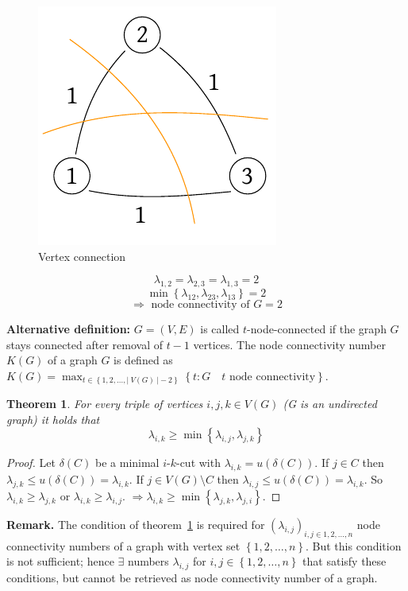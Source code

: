 \documentclass{article}
\newtheorem{theorem}{Theorem}
\newcommand{\card}[1]{\left|\:\!#1\:\!\right|}
\newcommand{\set}[1]{\left\{#1\right\}}
\begin{document}
\begin{figure}[ht]
 \begin{center}
  \includegraphics{img/vertex_connection.pdf}
  \caption{Vertex connection}
 \end{center}
\end{figure}
\[
  \lambda_{1,2} = \lambda_{2,3} = \lambda_{1,3} = 2
\] \[
  \min{\set{\lambda_{12}, \lambda_{23}, \lambda_{13}}} = 2
\] \[
  \Rightarrow \text{ node connectivity of } G = 2
\]

\textbf{Alternative definition:}
  $G = (V, E)$ is called $t$-node-connected if the graph $G$ stays connected after removal of $t-1$ vertices. The node connectivity number $K(G)$ of a graph $G$ is defined as $K(G) = \max_{t \in \set{1, 2, \ldots, \card{V(G)} - 2}} \set{t: G \quad t \text{ node connectivity}}$.

\begin{theorem}\label{lemma-4.5}
  For every triple of vertices $i, j, k \in V(G)$ (G is an undirected graph) it holds that
  \[
    \lambda_{i,k} \geq \min{\set{\lambda_{i,j}, \lambda_{j,k}}}
  \]
\end{theorem}

\begin{proof}
  Let $\delta(C)$ be a minimal $i$-$k$-cut with $\lambda_{i,k} = u(\delta(C))$.
  If $j \in C$ then $\lambda_{j,k} \leq u(\delta(C)) = \lambda_{i,k}$.
  If $j \in V(G) \setminus C$ then $\lambda_{i,j} \leq u(\delta(C)) = \lambda_{i,k}$.
  So $\lambda_{i,k} \geq \lambda_{j,k}$ or $\lambda_{i,k} \geq \lambda_{i,j}$.
  $\Rightarrow \lambda_{i,k} \geq \min{\set{\lambda_{j,k}, \lambda_{j,i}}}$.
\end{proof}

\textbf{Remark.}
  The condition of theorem~\ref{lemma-4.5} is required for $(\lambda_{i,j})_{i,j \in 1, 2, \ldots, n}$ node connectivity numbers of a graph with vertex set $\set{1, 2, \ldots, n}$.
  But this condition is not sufficient; hence $\exists$ numbers $\lambda_{i,j}$ for $i,j \in \set{1, 2, \ldots, n}$ that satisfy these conditions, but cannot be retrieved as node connectivity number of a graph.
\end{document}
